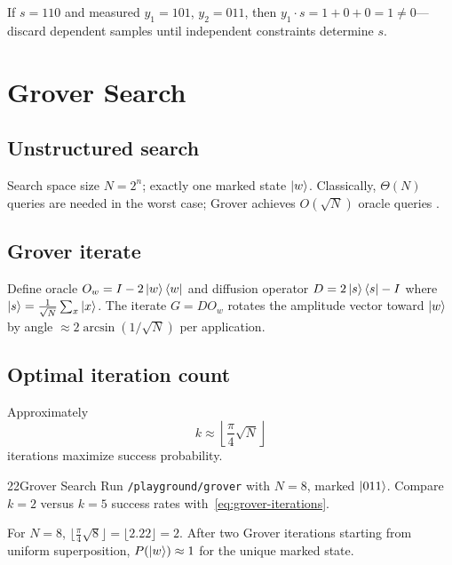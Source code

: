 \begin{example}
If $s=110$ and measured $y_1=101$, $y_2=011$, then $y_1\cdot s=1+0+0=1\neq 0$---discard dependent samples until independent constraints determine $s$.
\end{example}

\section{Grover Search}
\label{sec:grover}

\subsection{Unstructured search}

Search space size $N=2^n$; exactly one marked state $\ket{w}$. Classically, $\Theta(N)$ queries are needed in the worst case; Grover achieves $O(\sqrt{N})$ oracle queries \cite{grover1996}.

\subsection{Grover iterate}

Define oracle $O_w=I-2\ket{w}\bra{w}$ and diffusion operator $D=2\ket{s}\bra{s}-I$ where $\ket{s}=\frac{1}{\sqrt{N}}\sum_x\ket{x}$. The iterate $G=DO_w$ rotates the amplitude vector toward $\ket{w}$ by angle $\approx 2\arcsin(1/\sqrt{N})$ per application.

\subsection{Optimal iteration count}

Approximately
\begin{equation}
k\approx \left\lfloor\frac{\pi}{4}\sqrt{N}\right\rfloor
\label{eq:grover-iterations}
\end{equation}
iterations maximize success probability.

\begin{labbox}{22}{Grover Search}
Run \texttt{/playground/grover} with $N=8$, marked $\ket{011}$. Compare $k=2$ versus $k=5$ success rates with~\eqref{eq:grover-iterations}.
\end{labbox}

\begin{example}
For $N=8$, $\lfloor\frac{\pi}{4}\sqrt{8}\rfloor=\lfloor 2.22\rfloor=2$. After two Grover iterations starting from uniform superposition, $P(\ket{w})\approx 1$ for the unique marked state.
\end{example}

